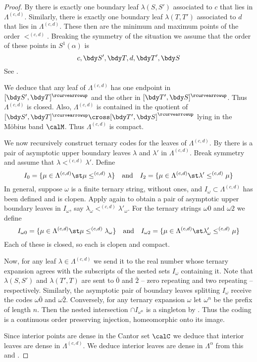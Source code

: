 \documentclass[12pt]{amsart}
\newcommand{\acw}{\rcurvearrowup}
\begin{document}
\begin{proof}
By  there is exactly one boundary leaf $\lambda(S, S')$ associated to $c$ that lies in $\Lambda^{(c, d)}$.
Similarly, there is exactly one boundary leaf $\lambda(T, T')$ associated to $d$ that lies in $\Lambda^{(c, d)}$.  These then are the minimum and maximum points of the order $<^{(c, d)}$.  Breaking the symmetry of the situation we assume that the order of these points in $S^1(\alpha)$ is 
\[
c, \bdy S', \bdy T, d, \bdy T', \bdy S
\]
See .

We deduce that any leaf of $\Lambda^{(c, d)}$ has one endpoint in $[\bdy S', \bdy T]^\acw$ and the other in $[\bdy T', \bdy S]^\acw$. 
Thus $\Lambda^{(c, d)}$ is closed. Also, $\Lambda^{(c, d)}$ is contained in the quotient of $[\bdy S', \bdy T]^\acw \cross [\bdy T', \bdy S]^\acw$ lying in the M\"obius band $\calM$.  Thus $\Lambda^{(c, d)}$ is compact.  

We now recursively construct ternary codes for the leaves of $\Lambda^{(c, d)}$.  By  there is a pair of asymptotic upper boundary leaves $\lambda$ and $\lambda'$ in $\Lambda^{(c, d)}$.  Break symmetry and assume that $\lambda <^{(c,d)} \lambda'$.  Define
\[
I_0 = \{ \mu \in \Lambda^{(c, d)} \st \mu \leq^{(c,d)} \lambda \} 
\quad
\mbox{and}
\quad
I_2 = \{ \mu \in \Lambda^{(c, d)} \st \lambda' \leq^{(c,d)} \mu \} 
\]
In general, suppose $\omega$ is a finite ternary string, without ones, and $I_\omega \subset \Lambda^{(c, d)}$ has been defined and is clopen.  Apply  again to obtain a pair of asymptotic upper boundary leaves in $I_\omega$, say $\lambda_\omega <^{(c,d)} \lambda'_\omega$.  For the ternary strings $\omega 0$ and $\omega 2$ we define 
\[
I_{\omega 0} = \{ \mu \in \Lambda^{(c, d)} \st \mu \leq^{(c,d)} \lambda_\omega \} \\
\quad
\mbox{and}
\quad
I_{\omega 2} = \{ \mu \in \Lambda^{(c, d)} \st \lambda'_\omega \leq^{(c,d)} \mu \} 
\]
Each of these is closed, so each is clopen and compact.

Now, for any leaf $\lambda \in \Lambda^{(c, d)}$ we send it to the real number whose ternary expansion agrees with the subscripts of the nested sets $I_\omega$ containing it.  Note that $\lambda(S, S')$ and $\lambda(T', T)$ are sent to $\bar{0}$ and $\bar{2}$ -- zero repeating and two repeating -- respectively.  Similarly, the asymptotic pair of boundary leaves splitting $I_\omega$ receive the codes $\omega \bar{0}$ and $\omega \bar{2}$.  Conversely, for any ternary expansion $\omega$ let $\omega^n$ be the prefix of length $n$.  Then the nested intersection $\cap I_{\omega^n}$ is a singleton by .  Thus the coding is a continuous order preserving injection, homeomorphic onto its image. 


Since interior points are dense in the Cantor set $\calC$ we deduce that interior leaves are dense in $\Lambda^{(c, d)}$.  We deduce interior leaves are dense in $\Lambda^\alpha$ from this and . 
\end{proof}
\end{document}
